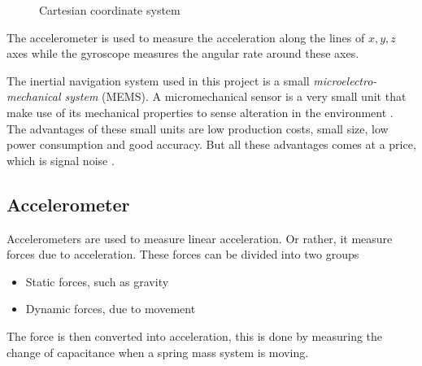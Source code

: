 \documentclass[a4paper,11pt]{kth-mag}
\begin{document}
\begin{figure}[!hbt] 
\centering
{}
%
%

\caption{Cartesian coordinate system}
\label{Figure: cartesian}
\end{figure}
 
The accelerometer is used to measure the acceleration along the lines of $x,y,z$ axes while the gyroscope measures the angular rate around these axes.
 
The inertial navigation system used in this project is a small \textit{microelectro-mechanical system} (MEMS). A micromechanical sensor is a very small unit that make use of its mechanical properties to sense alteration in the environment \cite{ref:accelerometero}. The advantages of these small units are low production costs, small size, low power consumption and good accuracy. But all these advantages comes at a price, which is signal noise \cite{IMUintro}.
\subsection{Accelerometer} \label{sec: accelerometer}
Accelerometers are used to measure linear acceleration. Or rather, it measure forces due to acceleration. These forces can be divided into two groups
\begin{itemize}
\item Static forces, such as gravity
\item Dynamic forces, due to movement
\end{itemize}
The force is then converted into acceleration, this is done by measuring the change of capacitance when a spring mass system is moving.
\end{document}
